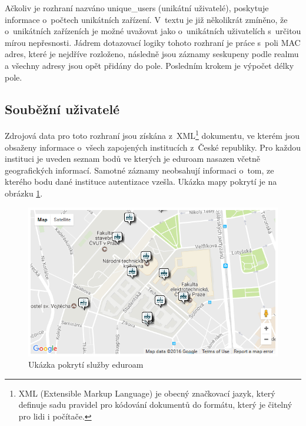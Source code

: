 \documentclass[thesis=M,czech]{FITthesis}[2012/06/26]
\begin{document}
      Ačkoliv je rozhraní nazváno unique\_users (unikátní uživatelé),
      poskytuje informace o~počtech unikátních zařízení.
      V~textu je již několikrát zmíněno, že o~unikátních
      zařízeních je možné uvažovat jako o~unikátních uživatelích s~určitou mírou nepřesnosti.
      Jádrem dotazovací logiky tohoto rozhraní je práce s~poli MAC adres,
      které je nejdříve rozloženo, následně jsou záznamy seskupeny podle realmu
      a všechny adresy jsou opět přidány do pole.
      Posledním krokem je výpočet délky pole.

    \subsection{Souběžní uživatelé}
    \label{concurrent_users}
      
      Zdrojová data pro toto rozhraní jsou získána z~XML\footnote{
        XML (Extensible Markup Language) je obecný značkovací jazyk, který definuje sadu pravidel
        pro kódování dokumentů do formátu, který je čitelný pro lidi i počítače.
      }
      dokumentu, ve kterém jsou obsaženy informace o~všech zapojených institucích z~České republiky.
      Pro každou instituci je uveden seznam bodů ve kterých je eduroam nasazen včetně
      geografických informací.
      Samotné záznamy neobsahují informaci o~tom, ze kterého bodu dané instituce autentizace vzešla.
      Ukázka mapy pokrytí je na obrázku \ref{fig:geo_map}.

      \begin{figure}
        \centering
          \includegraphics[scale=0.5]{geo_map.png}
        \caption[Ukázka pokrytí služby eduroam]{Ukázka pokrytí služby eduroam \cite{eduroam_cz}}
        \label{fig:geo_map}
      \end{figure}
\end{document}
